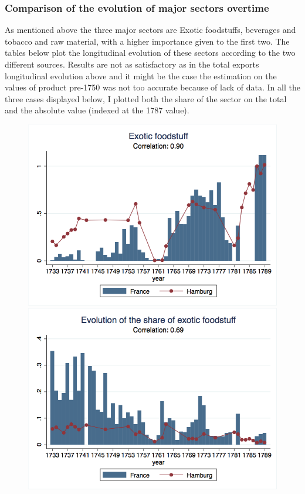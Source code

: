 \documentclass[12pt,a4paper,titlepage,english]{article}
\begin{document}
\subsubsection{Comparison of the evolution of major sectors overtime}
As mentioned above the three major sectors are Exotic foodstuffs, beverages and tobacco and raw material, with a higher importance given to the first two. The tables below plot the longitudinal evolution of these sectors according to the two different sources. Results are not as satisfactory as in the total exports longitudinal evolution above and it might be the case the estimation on the values of product pre-1750 was not too accurate because of lack of data. In all the three cases displayed below, I plotted both the share of the sector on the total and the absolute value (indexed at the 1787 value). 
\begin{figure}
\includegraphics[scale=.28]{exotic_food_long.png}
\includegraphics[scale=.28]{exotic_food_share.png}\\
\end{figure}
\end{document}
